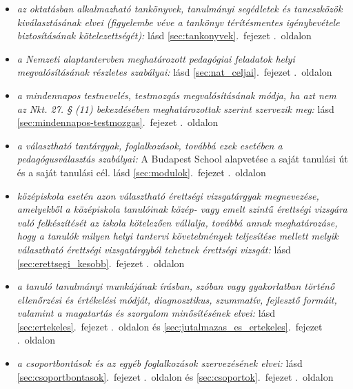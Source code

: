 \begin{itemize}
\item \emph{az oktatásban alkalmazható tankönyvek, tanulmányi segédletek és taneszközök kiválasztásának elvei (figyelembe véve a tankönyv térítésmentes igénybevétele biztosításának kötelezettségét): }    
       lásd        \ref{sec:tankonyvek}.~fejezet .~oldalon
              
\item \emph{a Nemzeti alaptantervben meghatározott pedagógiai feladatok helyi megvalósításának részletes szabályai: }    
       lásd        \ref{sec:nat_celjai}.~fejezet .~oldalon
              
\item \emph{a mindennapos testnevelés, testmozgás megvalósításának módja, ha azt nem az Nkt. 27. § (11) bekezdésében meghatározottak szerint szervezik meg: }    
       lásd        \ref{sec:mindennapos-testmozgas}.~fejezet .~oldalon
              
\item \emph{a választható tantárgyak, foglalkozások, továbbá ezek esetében a pedagógusválasztás szabályai: }   A Budapest School alapvetése a saját tanulási út és a saját tanulási cél. 
       lásd        \ref{sec:modulok}.~fejezet .~oldalon
              
\item \emph{középiskola esetén azon választható érettségi vizsgatárgyak megnevezése, amelyekből a középiskola tanulóinak közép- vagy emelt szintű érettségi vizsgára való felkészítését az iskola kötelezően vállalja, továbbá annak meghatározáse, hogy a tanulók milyen helyi tantervi követelmények teljesítése mellett melyik választható érettségi vizsgatárgyból tehetnek érettségi vizsgát: }    
       lásd        \ref{sec:erettsegi_kesobb}.~fejezet .~oldalon
              
\item \emph{a tanuló tanulmányi munkájának írásban, szóban vagy gyakorlatban történő ellenőrzési és értékelési módját, diagnosztikus, szummatív, fejlesztő formáit, valamint a magatartás és szorgalom minősítésének elvei: }    
       lásd        \ref{sec:ertekeles}.~fejezet .~oldalon és 
              \ref{sec:jutalmazas_es_ertekeles}.~fejezet .~oldalon
              
\item \emph{a csoportbontások és az egyéb foglalkozások szervezésének elvei: }    
       lásd        \ref{sec:csoportbontasok}.~fejezet .~oldalon és 
              \ref{sec:csoportok}.~fejezet .~oldalon
              

\end{itemize}
